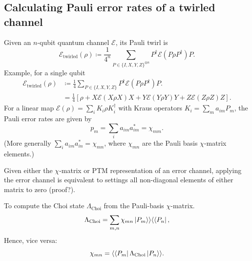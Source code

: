 \documentclass{article}
\begin{document}
\subsection{Calculating Pauli error rates of a twirled channel}
Given an $n$-qubit quantum channel $\mathcal{E}$, its Pauli twirl is
\begin{equation}
    \mathcal{E}_\text{twirled}(\rho) \coloneqq \frac{1}{4^n} \sum_{{P \in \{I, X, Y, Z\}}^{\otimes n}}P^\dagger\mathcal{E}(P\rho P^\dagger)P.
\end{equation}
Example, for a single qubit
\begin{equation}
    \begin{split}
        \mathcal{E}_\text{twirled}(\rho) &\coloneqq \frac{1}{4} \sum_{P \in \{I, X, Y, Z\}}P^\dagger\mathcal{E}(P\rho P^\dagger)P.\\
        &= \frac{1}{4} \left[\rho + X\mathcal{E}(X\rho X)X + Y\mathcal{E}(Y\rho Y)Y + Z\mathcal{E}(Z\rho Z)Z \right].
    \end{split}
\end{equation}
For a linear map $\mathcal{E}(\rho)=\sum_i K_i\rho K_i^\dagger$ with Kraus operators $K_i=\sum_ma_{im}P_m$, the Pauli error rates are given by
\begin{equation}
    p_m = \sum_i a_{im}a^*_{im}=\chi_{mm}.
\end{equation}
(More generally $\sum_i a_{im}a^*_{in}=\chi_{mn}$, where $\chi_{mn}$ are the Pauli basis $\chi$-matrix elements.)

Given either the $\chi$-matrix or PTM representation of an error channel, applying the error channel is equivalent to settings all non-diagonal elements of either matrix to zero (proof?).

To compute the Choi state $\Lambda_\mathrm{Choi}$ from the Pauli-basis $\chi$-matrix.
\begin{equation}
\Lambda_\mathrm{Choi} = \sum_{m,n}\chi_{mn}\ket{P_m}\rangle\langle\bra{P_n},
\end{equation}
Hence, vice versa:
\begin{equation}
    \chi_{mn} = \langle\bra{P_m}\Lambda_\mathrm{Choi}\ket{P_n}\rangle.
\end{equation}
\end{document}
